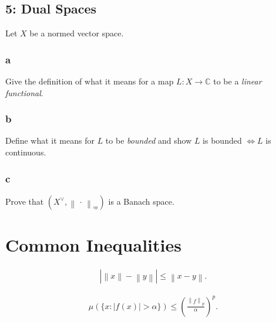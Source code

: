 \hypertarget{dual-spaces}{%
\subsection{5: Dual Spaces}\label{dual-spaces}}

Let \(X\) be a normed vector space.

\hypertarget{a-5}{%
\subsubsection{a}\label{a-5}}

Give the definition of what it means for a map \(L:X\to {\mathbb{C}}\)
to be a \emph{linear functional}.

\hypertarget{b-5}{%
\subsubsection{b}\label{b-5}}

Define what it means for \(L\) to be \emph{bounded} and show \(L\) is
bounded \(\iff L\) is continuous.

\hypertarget{c-3}{%
\subsubsection{c}\label{c-3}}

Prove that
\((X^\vee, {\left\lVert {{\,\cdot\,}} \right\rVert}_{^{\operatorname{op}}})\)
is a Banach space.

\hypertarget{common-inequalities}{%
\section{Common Inequalities}\label{common-inequalities}}

\begin{proposition}

\begin{align*}  
{\left\lvert {{\left\lVert {x} \right\rVert} - {\left\lVert {y} \right\rVert}} \right\rvert} \leq {\left\lVert {x - y} \right\rVert}
.\end{align*}

\end{proposition}

\begin{proposition}

\begin{align*}  
\mu(\{x:|f(x)|>\alpha\}) \leq\left(\frac{{\left\lVert {f} \right\rVert}_{p}}{\alpha}\right)^{p}
.\end{align*}

\end{proposition}

